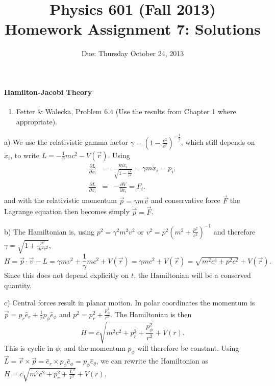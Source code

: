 \documentclass[letterpaper,11pt]{article}
\title{Physics 601 (Fall 2013) \\ Homework Assignment 7: Solutions}
\date{Due: Thursday October 24, 2013}
\begin{document}
\maketitle

\paragraph*{Hamilton-Jacobi Theory}
\begin{enumerate}
 \item Fetter \& Walecka, Problem 6.4 (Use the results from Chapter 1 where appropriate).
\end{enumerate}
a) We use the relativistic gamma factor $\gamma = \left(1-\frac{v^2}{c^2}\right)^{-\frac{1}{2}}$, which still depends on $\dot{x}_i$, to write $L = -\frac{1}{\gamma}mc^2 - V(\vec{r})$.  Using
\begin{eqnarray*}
 \frac{\partial L}{\partial \dot{x}_i} & = & \frac{m \dot{x}_i}{\sqrt{1-\frac{v^2}{c^2}}} = \gamma m \dot{x}_i = p_i, \\
 \frac{\partial L}{\partial x_i} & = & -\frac{\partial V}{\partial x_i} = F_i.
\end{eqnarray*}
and with the relativistic momentum $\vec{p} = \gamma m \vec{v}$ and conservative force $\vec{F}$ the Lagrange equation then becomes simply $\dot{\vec{p}} = \vec{F}$.

b) The Hamiltonian is, using $p^2 = \gamma^2 m^2 v^2$ or $v^2 = p^2\left(m^2 + \frac{p^2}{c^2}\right)^{-1}$ and therefore $\gamma = \sqrt{1 + \frac{p^2}{m^2c^2}}$,
\begin{equation*}
 H = \vec{p} \cdot \vec{v} - L = \gamma m v^2 + \frac{1}{\gamma} mc^2 + V(\vec{r}) = \gamma m c^2 + V(\vec{r}) = \sqrt{m^2 c^4 + p^2 c^2} + V(\vec{r}).
\end{equation*}
Since this does not depend explicitly on $t$, the Hamiltonian will be a conserved quantity.

c) Central forces result in planar motion.  In polar coordinates the momentum is $\vec{p} = p_r \hat{e}_r + \frac{1}{r} p_\phi \hat{e}_\phi$ and $p^2 = p_r^2 + \frac{p_\phi^2}{r^2}$.  The Hamiltonian is then
\begin{equation*}
 H = c \sqrt{m^2 c^2 + p_r^2 + \frac{p_\phi^2}{r^2}} + V(r).
\end{equation*}
This is cyclic in $\phi$, and the momentum $p_\phi$ will therefore be constant.  Using $\vec{L} = \vec{r} \times \vec{p} = \hat{e}_r \times p_\phi \hat{e}_\phi = p_\phi \hat{e}_\theta$, we can rewrite the Hamiltonian as $H = c \sqrt{m^2 c^2 + p_r^2 + \frac{L^2}{r^2}} + V(r)$.
\end{document}
